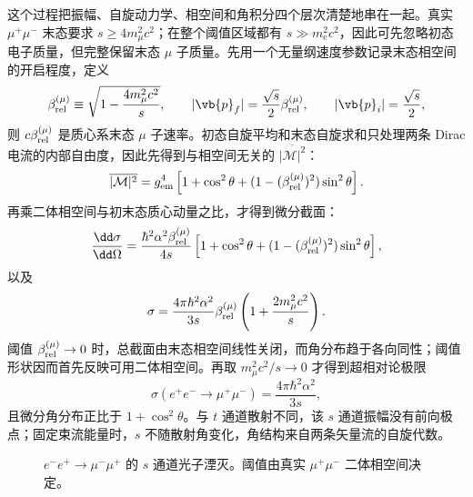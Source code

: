 这个过程把振幅、自旋动力学、相空间和角积分四个层次清楚地串在一起。真实 $\mu^+\mu^-$ 末态要求 $s\ge4m_\mu^2c^2$；在整个阈值区域都有 $s\gg m_{\mathrm e}^2c^2$，因此可先忽略初态电子质量，但完整保留末态 $\mu$ 子质量。先用一个无量纲速度参数记录末态相空间的开启程度，定义
\begin{equation}
 \beta_{\rm rel}^{(\mu)}
 \equiv\sqrt{1-\frac{4m_\mu^2c^2}{s}},
 \qquad
 |\vb{p}_f|=\frac{\sqrt s}{2}\beta_{\rm rel}^{(\mu)},
 \qquad
 |\vb{p}_i|=\frac{\sqrt s}{2},
 \label{eq:mumu-beta-si-r10}
\end{equation}
则 $c\beta_{\rm rel}^{(\mu)}$ 是质心系末态 $\mu$ 子速率。初态自旋平均和末态自旋求和只处理两条 Dirac 电流的内部自由度，因此先得到与相空间无关的 $\overline{|\mathcal M|^2}$：
\begin{equation}
 {
 \overline{|\mathcal M|^2}
 =g_{\rm em}^4\left[
 1+\cos^2\theta
 +(1-(\beta_{\rm rel}^{(\mu)})^2)\sin^2\theta
 \right].}
 \label{eq:mumu-M2-massive-angle-si-r10}
\end{equation}
再乘二体相空间与初末态质心动量之比，才得到微分截面：
\begin{equation}
 {
 \frac{\dd\sigma}{\dd\Omega}
 =\frac{\hbar^2\alpha^2\beta_{\rm rel}^{(\mu)}}{4s}
 \left[
 1+\cos^2\theta
 +(1-(\beta_{\rm rel}^{(\mu)})^2)\sin^2\theta
 \right],}
 \label{eq:mumu-dsigma-massive-si-r10}
\end{equation}
以及
\begin{equation}
 {
 \sigma
 =\frac{4\pi\hbar^2\alpha^2}{3s}
 \beta_{\rm rel}^{(\mu)}\left(1+\frac{2m_\mu^2c^2}{s}\right).}
 \label{eq:mumu-total-massive-si-r10}
\end{equation}
阈值 $\beta_{\rm rel}^{(\mu)}\to0$ 时，总截面由末态相空间线性关闭，而角分布趋于各向同性；阈值形状因而首先反映可用二体相空间。再取 $m_\mu^2c^2/s\to0$ 才得到超相对论极限
\begin{equation}
 {
 \sigma(e^+e^-\to\mu^+\mu^-)
 =\frac{4\pi\hbar^2\alpha^2}{3s},}
 \label{eq:ee-mumu-total}
\end{equation}
且微分角分布正比于 $1+\cos^2\theta$。与 $t$ 通道散射不同，该 $s$ 通道振幅没有前向极点；固定束流能量时，$s$ 不随散射角变化，角结构来自两条矢量流的自旋代数。

\begin{figure}[htbp]
 \centering
 
 \caption{$e^-e^+\to\mu^-\mu^+$ 的 $s$ 通道光子湮灭。阈值由真实 $\mu^+\mu^-$ 二体相空间决定。}
 \label{fig:ee-mumu}
\end{figure}

